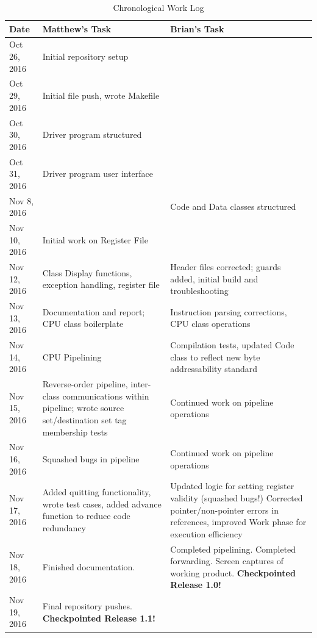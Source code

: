 \documentclass[12pt]{article}
\begin{document}
\begin{table}
  \centering
  \caption{Chronological Work Log}
  \label{tab:worklog}
  \begin{tabular}{l|p{2.75in}|p{2.75in}}
    Date & Matthew's Task & Brian's Task \\
    \hline
	Oct 26, 2016 & Initial repository setup 				& \\
	Oct 29, 2016 & Initial file push, wrote Makefile 	& \\
	Oct 30, 2016 & Driver program structured 			& \\
	Oct 31, 2016 & Driver program user interface			&  \\
	Nov 8, 2016  & 										& Code and Data classes structured \\
	Nov 10, 2016 & Initial work on Register File			& \\
	Nov 12, 2016 & Class Display functions, 
	exception handling, register file 					& Header files corrected; guards added, initial build and troubleshooting \\
	Nov 13, 2016 & Documentation and report; CPU class boilerplate & Instruction parsing corrections, CPU class operations \\
	Nov 14, 2016 & CPU Pipelining & Compilation tests, updated Code class to reflect new byte addressability standard \\
	Nov 15, 2016 & Reverse-order pipeline, inter-class communications within pipeline; wrote source set/destination set tag membership tests & Continued work on pipeline operations \\
	Nov 16, 2016 & Squashed bugs in pipeline & Continued work on pipeline operations \\
	Nov 17, 2016 & Added quitting functionality, wrote test cases, added advance function to reduce code redundancy & Updated logic for setting register validity (squashed bugs!) Corrected pointer/non-pointer errors in references, improved Work phase for execution efficiency \\
	Nov 18, 2016 & Finished documentation. & Completed pipelining. Completed forwarding. Screen captures of working product. \textbf{Checkpointed Release 1.0!} \\
	Nov 19, 2016 & Final repository pushes. \textbf{Checkpointed Release 1.1!} & \\
	
	
	 
  \end{tabular}
\end{table}
\end{document}
